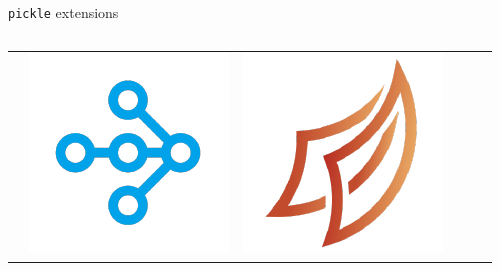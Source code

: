 \documentclass[13pt, usenames,dvipsnames]{beamer} %
\newcommand{\mycode}[2][\tiny] {\texttt{#2}}
\begin{document}
\begin{frame}[fragile]{\mycode[\small]{pickle} extensions}
{        \inputminted[bgcolor=beige, fontsize=\tiny]{pycon}{scripts/cloudpickle_example_2.py}
        \begin{tabular}{m{3cm} m{1cm} m{1cm} m{1cm} m{1cm} m{1cm}}
            &
            \includegraphics[width=\linewidth] {media/ray-logo.png} &
            \includegraphics[width=\linewidth] {media/dask-logo.png} &

\end{tabular}}
\end{frame}
\end{document}

